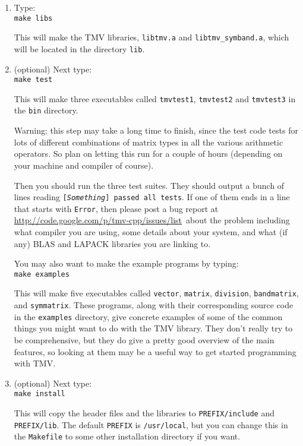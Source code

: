 \documentclass[twoside,letterpaper,11pt]{article}
\newcommand{\myissuesx}{http://code.google.com/p/tmv-cpp/issues/list}
\newcommand{\myissues}{\url{\myissuesx}}
\begin{document}
\begin{enumerate}
\item
Type: \\
\texttt{make libs}

This will make the TMV libraries, \texttt{libtmv.a} and \texttt{libtmv\_symband.a},
which will be located in the directory \texttt{lib}.

\item
(optional) Next type:\\
\texttt{make test}

This will make three executables called \texttt{tmvtest1}, 
\texttt{tmvtest2} and \texttt{tmvtest3} in the \texttt{bin} directory.

Warning: this step may take a long time to finish, since
the test code tests
for lots of different combinations of matrix types in all the various 
arithmetic operators.
So plan on letting this run
for a couple of hours (depending on your machine and compiler of course).

Then you should run the three test suites.
They should output a bunch of lines reading \texttt{[{\em Something}] passed all tests}.
If one of them ends in a line that starts with \texttt{Error}, 
then please post a bug report at \myissues\ about the problem including what compiler
you are using, some details about your system, and what (if any) BLAS and LAPACK
libraries you are linking to.

You may also want to make the example programs by typing:\\
\texttt{make examples}

This will make five executables called \texttt{vector}, \texttt{matrix}, \texttt{division},
\texttt{bandmatrix}, and \texttt{symmatrix}.
These programs, along with their corresponding source code in the \texttt{examples}
directory, give concrete examples of some of the common things you might want
to do with the TMV library.  They don't really try to be comprehensive,
but they do give a pretty good overview of the main features,
so looking at them may be a useful way to get started programming with TMV.

\item
(optional) Next type:\\
\texttt{make install}

This will copy the header files and the libraries to \texttt{PREFIX/include} and 
\texttt{PREFIX/lib}.  The default \texttt{PREFIX} is \texttt{/usr/local}, but you can change
this in the \texttt{Makefile} to some other installation directory if you want.


\end{enumerate}
\end{document}
